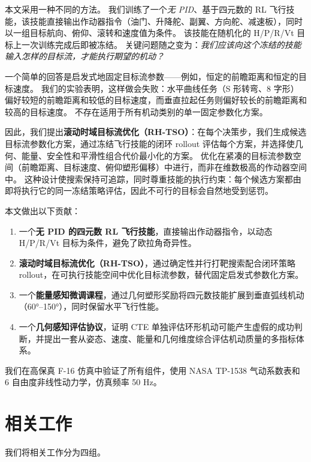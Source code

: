 \documentclass{article}
\begin{document}
本文采用一种不同的方法。
我们训练了一个\emph{无 PID}、基于四元数的 RL 飞行技能，该技能直接输出作动器指令（油门、升降舵、副翼、方向舵、减速板），同时以一组目标航向、俯仰、滚转和速度值为条件。
该技能在随机化的 H/P/R/Vt 目标上一次训练完成后即被冻结。
关键问题随之变为：\emph{我们应该向这个冻结的技能输入怎样的目标流，才能执行期望的机动？}

一个简单的回答是启发式地固定目标流参数——例如，恒定的前瞻距离和恒定的目标速度。
我们的实验表明，这样做会失败：水平曲线任务（S 形转弯、8 字形）偏好较短的前瞻距离和较低的目标速度，而垂直拉起任务则偏好较长的前瞻距离和较高的目标速度。
不存在适用于所有机动类别的单一固定参数化方案。

因此，我们提出\textbf{滚动时域目标流优化（RH-TSO）}：在每个决策步，我们生成候选目标流参数化方案，通过冻结飞行技能的闭环 rollout 评估每个方案，并选择使几何、能量、安全性和平滑性组合代价最小化的方案。
优化在紧凑的目标流参数空间（前瞻距离、目标速度、俯仰塑形偏移）中进行，而非在维数极高的作动器空间中。
这种设计使搜索保持可追踪，同时尊重技能的执行约束：每个候选方案都由即将执行它的同一冻结策略评估，因此不可行的目标会自然地受到惩罚。

本文做出以下贡献：
\begin{enumerate}
  \item 一个\textbf{无 PID 的四元数 RL 飞行技能}，直接输出作动器指令，以动态 H/P/R/Vt 目标为条件，避免了欧拉角奇异性。
  \item \textbf{滚动时域目标流优化（RH-TSO）}，通过确定性并行打靶搜索配合闭环策略 rollout，在可执行技能空间中优化目标流参数，替代固定启发式参数化方案。
  \item 一个\textbf{能量感知微调课程}，通过几何塑形奖励将四元数技能扩展到垂直弧线机动（60°--150°），同时保留水平飞行性能。
  \item 一个\textbf{几何感知评估协议}，证明 CTE 单独评估环形机动可能产生虚假的成功判断，并提出一套从姿态、速度、能量和几何维度综合评估机动质量的多指标体系。
\end{enumerate}

我们在高保真 F-16 仿真中验证了所有组件，使用 NASA TP-1538 气动系数表和 6 自由度非线性动力学，仿真频率 50 Hz。


\section{相关工作}

我们将相关工作分为四组。
\end{document}
